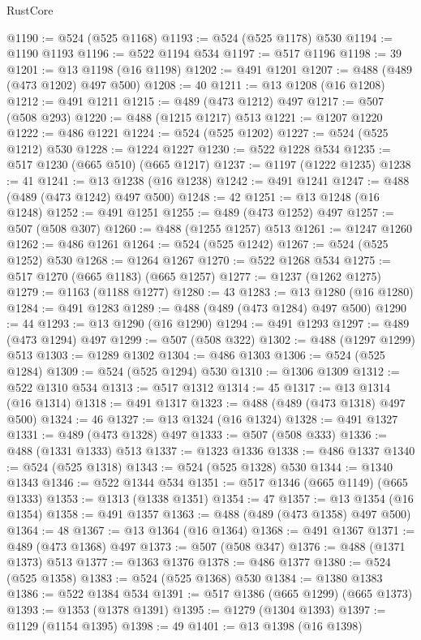 \begin{lexlean}{RustCore}
\begin{coremodule}
@1190 := @524 (@525 @1168)
@1193 := @524 (@525 @1178) @530
@1194 := @1190 @1193
@1196 := @522 @1194 @534
@1197 := @517 @1196
@1198 := 39
@1201 := @13 @1198 (@16 @1198)
@1202 := @491 @1201
@1207 := @488 (@489 (@473 @1202) @497 @500)
@1208 := 40
@1211 := @13 @1208 (@16 @1208)
@1212 := @491 @1211
@1215 := @489 (@473 @1212) @497
@1217 := @507 (@508 @293)
@1220 := @488 (@1215 @1217) @513
@1221 := @1207 @1220
@1222 := @486 @1221
@1224 := @524 (@525 @1202)
@1227 := @524 (@525 @1212) @530
@1228 := @1224 @1227
@1230 := @522 @1228 @534
@1235 := @517 @1230 (@665 @510) (@665 @1217)
@1237 := @1197 (@1222 @1235)
@1238 := 41
@1241 := @13 @1238 (@16 @1238)
@1242 := @491 @1241
@1247 := @488 (@489 (@473 @1242) @497 @500)
@1248 := 42
@1251 := @13 @1248 (@16 @1248)
@1252 := @491 @1251
@1255 := @489 (@473 @1252) @497
@1257 := @507 (@508 @307)
@1260 := @488 (@1255 @1257) @513
@1261 := @1247 @1260
@1262 := @486 @1261
@1264 := @524 (@525 @1242)
@1267 := @524 (@525 @1252) @530
@1268 := @1264 @1267
@1270 := @522 @1268 @534
@1275 := @517 @1270 (@665 @1183) (@665 @1257)
@1277 := @1237 (@1262 @1275)
@1279 := @1163 (@1188 @1277)
@1280 := 43
@1283 := @13 @1280 (@16 @1280)
@1284 := @491 @1283
@1289 := @488 (@489 (@473 @1284) @497 @500)
@1290 := 44
@1293 := @13 @1290 (@16 @1290)
@1294 := @491 @1293
@1297 := @489 (@473 @1294) @497
@1299 := @507 (@508 @322)
@1302 := @488 (@1297 @1299) @513
@1303 := @1289 @1302
@1304 := @486 @1303
@1306 := @524 (@525 @1284)
@1309 := @524 (@525 @1294) @530
@1310 := @1306 @1309
@1312 := @522 @1310 @534
@1313 := @517 @1312
@1314 := 45
@1317 := @13 @1314 (@16 @1314)
@1318 := @491 @1317
@1323 := @488 (@489 (@473 @1318) @497 @500)
@1324 := 46
@1327 := @13 @1324 (@16 @1324)
@1328 := @491 @1327
@1331 := @489 (@473 @1328) @497
@1333 := @507 (@508 @333)
@1336 := @488 (@1331 @1333) @513
@1337 := @1323 @1336
@1338 := @486 @1337
@1340 := @524 (@525 @1318)
@1343 := @524 (@525 @1328) @530
@1344 := @1340 @1343
@1346 := @522 @1344 @534
@1351 := @517 @1346 (@665 @1149) (@665 @1333)
@1353 := @1313 (@1338 @1351)
@1354 := 47
@1357 := @13 @1354 (@16 @1354)
@1358 := @491 @1357
@1363 := @488 (@489 (@473 @1358) @497 @500)
@1364 := 48
@1367 := @13 @1364 (@16 @1364)
@1368 := @491 @1367
@1371 := @489 (@473 @1368) @497
@1373 := @507 (@508 @347)
@1376 := @488 (@1371 @1373) @513
@1377 := @1363 @1376
@1378 := @486 @1377
@1380 := @524 (@525 @1358)
@1383 := @524 (@525 @1368) @530
@1384 := @1380 @1383
@1386 := @522 @1384 @534
@1391 := @517 @1386 (@665 @1299) (@665 @1373)
@1393 := @1353 (@1378 @1391)
@1395 := @1279 (@1304 @1393)
@1397 := @1129 (@1154 @1395)
@1398 := 49
@1401 := @13 @1398 (@16 @1398)

\end{coremodule}
\end{lexlean}
